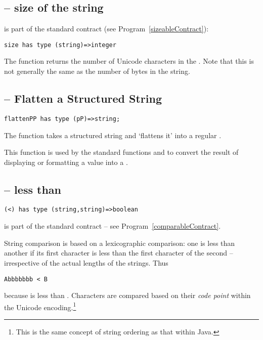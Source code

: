 \subsection{ -- size of the string}
\label{stringSizeFunction}
 is part of the standard  contract (see Program~\vref{sizeableContract}):
\begin{lstlisting}
size has type (string)=>integer
\end{lstlisting}
The  function returns the number of Unicode characters in the . Note that this is not generally the same as the number of bytes in the string.

\subsection{ -- Flatten a Structured String}
\begin{lstlisting}
flattenPP has type (pP)=>string;
\end{lstlisting}
The  function takes a structured string and `flattens it' into a regular .

\begin{aside}
This function is used by the standard functions  and  to convert the result of displaying or formatting a value into a .
\end{aside}

\subsection{\q{<} -- less than}
\begin{lstlisting}
(<) has type (string,string)=>boolean
\end{lstlisting}
\q{(<)} is part of the standard  contract -- see Program~\vref{comparableContract}.

String comparison is based on a lexicographic comparison: one  is less than another if its first character is less than the first character of the second -- irrespective of the actual lengths of the strings. Thus
\begin{lstlisting}
Abbbbbbb < B
\end{lstlisting}
because  is less than . Characters are compared based on their \emph{code point} within the Unicode encoding.\footnote{This is the same concept of string ordering as that within Java\tm.}

